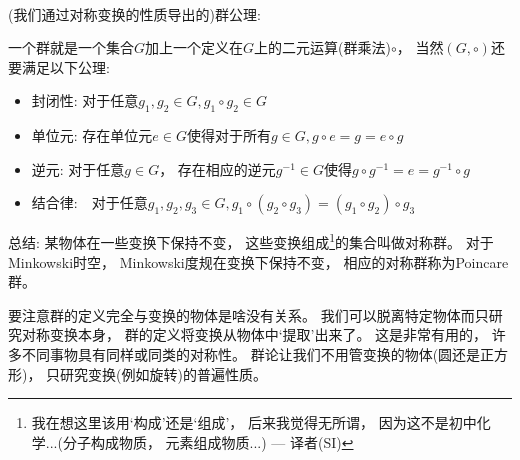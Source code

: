 \ 

(我们通过对称变换的性质导出的)群公理: 

一个群就是一个集合$G$加上一个定义在$G$上的二元运算(群乘法)$\circ$， 当然$(G, \circ)$还要满足以下公理: 
\begin{itemize}
	\item 封闭性: 对于任意$g_1, g_2 \in G, g_1 \circ g_2 \in G$
	
	\item 单位元: 存在单位元$e \in G$使得对于所有$g \in G, g\circ e = g = e \circ g$
	
	\item 逆元: 对于任意$g \in G$， 存在相应的逆元$g^{-1} \in G$使得$g \circ g^{-1} = e = g^{-1} \circ g$
	
	\item 结合律:　对于任意$g_1, g_2, g_3 \in G, g_1 \circ (g_2 \circ g_3) = (g_1 \circ g_2) \circ g_3$ 
\end{itemize}

总结: 某物体在一些变换下保持不变， 这些变换组成\footnote{我在想这里该用`构成'还是`组成'， 后来我觉得无所谓， 因为这不是初中化学...(分子构成物质， 元素组成物质...) --- 译者(SI)}的集合叫做对称群。 对于Minkowski时空， Minkowski度规在变换下保持不变， 相应的对称群称为Poincare群。

要注意群的定义完全与变换的物体是啥没有关系。 我们可以脱离特定物体而只研究对称变换本身， 群的定义将变换从物体中`提取'出来了。 这是非常有用的， 许多不同事物具有同样或同类的对称性。 群论让我们不用管变换的物体(圆还是正方形)， 只研究变换(例如旋转)的普遍性质。






